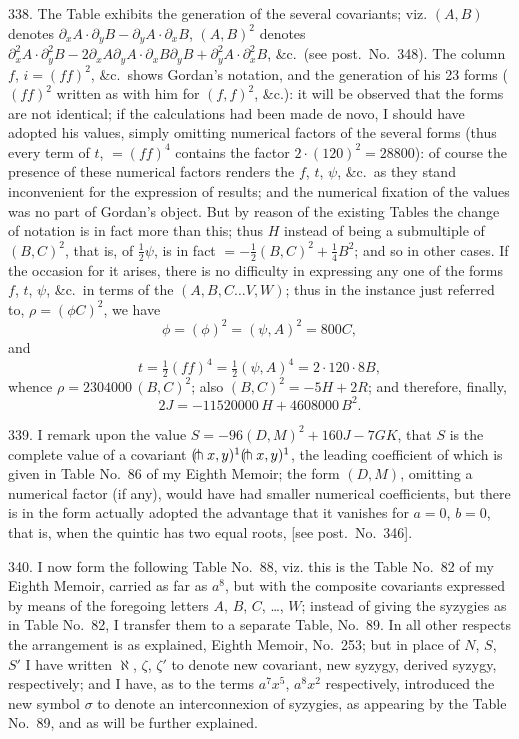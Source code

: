 \documentclass[11pt,a4paper]{article}
\begin{document}
338. The Table exhibits the generation of the several covariants; viz. $(A, B)$ denotes $\partial_{x}A \cdot \partial_{y}B - \partial_{y}A \cdot \partial_{x}B$, $(A, B)^{2}$ denotes $\partial_{x}^{2}A \cdot \partial_{y}^{2}B - 2\partial_{x}A\partial_{y}A \cdot \partial_{x}B\partial_{y}B + \partial_{y}^{2}A \cdot \partial_{x}^{2}B$, \&c.\ (see post.\ No.~348). The column $f$, $i = (ff)^{2}$, \&c.\ shows Gordan's notation, and the generation of his 23 forms ($(ff)^{2}$ written as with him for $(f,f)^{2}$, \&c.): it will be observed that the forms are not identical; if the calculations had been made de novo, I should have adopted his values, simply omitting numerical factors of the several forms (thus every term of $t$, $=(ff)^{4}$ contains the factor $2 \cdot (120)^{2} = 28800$): of course the presence of these numerical factors renders the $f$, $t$, $\psi$, \&c.\ as they stand inconvenient for the expression of results; and the numerical fixation of the values was no part of Gordan's object. But by reason of the existing Tables the change of notation is in fact more than this; thus $H$ instead of being a submultiple of $(B,C)^{2}$, that is, of $\frac{1}{2}\psi$, is in fact $=-\frac{1}{2}(B,C)^{2} + \frac{1}{4}B^{2}$; and so in other cases. If the occasion for it arises, there is no difficulty in expressing any one of the forms $f$, $t$, $\psi$, \&c.\ in terms of the $(A, B, C \ldots V, W)$; thus in the instance just referred to, $\rho = (\phi C)^{2}$, we have
\[
\phi = (\phi)^{2} = (\psi, A)^{2} = 800C,
\]
and
\[
t = \tfrac{1}{2}(ff)^{4} = \tfrac{1}{2}(\psi, A)^{4} = 2 \cdot 120 \cdot 8B,
\]
whence $\rho = 2304000\, (B, C)^{2}$; also $(B, C)^{2} = -5H + 2R$; and therefore, finally,
\[
2J = -11520000\, H + 4608000\, B^{2}.
\]

339. I remark upon the value $S = -96(D, M)^{2} + 160J - 7GK$, that $S$ is the complete value of a covariant $(\hspace{-0.2em}\pitchfork x, y)^{1}(\hspace{-0.2em}\pitchfork x, y)^{1}$, the leading coefficient of which is given in Table No.~86 of my Eighth Memoir; the form $(D, M)$, omitting a numerical factor (if any), would have had smaller numerical coefficients, but there is in the form actually adopted the advantage that it vanishes for $a=0$, $b=0$, that is, when the quintic has two equal roots, [see post.\ No.~346].

340. I now form the following Table No.~88, viz. this is the Table No.~82 of my Eighth Memoir, carried as far as $a^{8}$, but with the composite covariants expressed by means of the foregoing letters $A$, $B$, $C$, \ldots, $W$; instead of giving the syzygies as in Table No.~82, I transfer them to a separate Table, No.~89. In all other respects the arrangement is as explained, Eighth Memoir, No.~253; but in place of $N$, $S$, $S'$ I have written $\aleph$, $\zeta$, $\zeta'$ to denote new covariant, new syzygy, derived syzygy, respectively; and I have, as to the terms $a^{7}x^{5}$, $a^{8}x^{2}$ respectively, introduced the new symbol $\sigma$ to denote an interconnexion of syzygies, as appearing by the Table No.~89, and as will be further explained.
\end{document}
